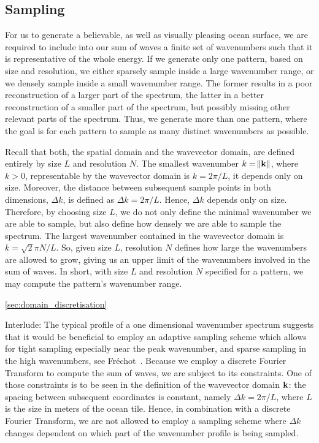 \subsection{Sampling}
%
For us to generate a believable, as well as visually pleasing ocean surface, we
are required to include into our sum of waves a finite set of wavenumbers such
that it is representative of the whole energy. If we generate only one pattern,
based on size and resolution, we either sparsely sample inside a large
wavenumber range, or we densely sample inside a small wavenumber range. The
former results in a poor reconstruction of a larger part of the spectrum, the
latter in a better reconstruction of a smaller part of the spectrum, but
possibly missing other relevant parts of the spectrum. Thus, we generate more
than one pattern, where the goal is for each pattern to sample as many distinct
wavenumbers as possible.

Recall that both, the spatial domain and the wavevector domain, are defined
entirely by size $L$ and resolution $N$. The smallest wavenumber
$k = \norm{\mathbf{k}}$, where $k > 0$, representable by the wavevector domain is
$k = 2\pi/L$, it depends only on size. Moreover, the distance between subsequent
sample points in both dimensions, $\Delta k$, is defined as $\Delta k = 2\pi/L$.
Hence, $\Delta k$ depends only on size. Therefore, by choosing size $L$, we do
not only define the minimal wavenumber we are able to sample, but also define
how densely we are able to sample the spectrum. The largest wavenumber contained
in the wavevector domain is $k = \sqrt{2}\pi N/L$. So, given size $L$,
resolution $N$ defines how large the wavenumbers are allowed to grow, giving us
an upper limit of the wavenumbers involved in the sum of waves. In short, with
size $L$ and resolution $N$ specified for a pattern, we may compute the
pattern's wavenumber range.

\ref{sec:domain_discretisation}




Interlude: The typical profile of a one dimensional wavenumber spectrum suggests
that it would be beneficial to employ an adaptive sampling scheme which allows
for tight sampling especially near the peak wavenumber, and sparse sampling in
the high wavenumbers, see Fr\'{e}chot~\cite{article:frechot2007}. Because we employ a discrete Fourier
Transform to compute the sum of waves, we are subject to its constraints. One of
those constraints is to be seen in the definition of the wavevector domain
$\mathbf{k}$: the spacing between subsequent coordinates is constant, namely
$\Delta k = {2\pi}/{L}$, where $L$ is the size in meters of the ocean tile.
Hence, in combination with a discrete Fourier Transform, we are not allowed to
employ a sampling scheme where $\Delta k$ changes dependent on which part of the
wavenumber profile is being sampled.

